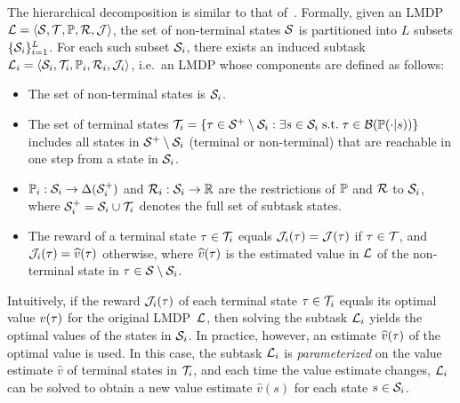 The hierarchical decomposition is similar to that of~\citep{Wen2020}. Formally, given an LMDP $\mathcal{L}=\langle\mathcal{S},\mathcal{T},\mathbb{P},\mathcal{R},\mathcal{J}\rangle$, the set of non-terminal states $\mathcal{S}$ is partitioned into $L$ subsets $\{\mathcal{S}_i\}_{i=1}^L$. For each such subset $\mathcal{S}_i$, there exists an induced subtask $\linebreak {\cL_i=\langle\cS_i,\cT_i,\kernel_i,\cR_i,\cJ_i\rangle}$, i.e.~an LMDP whose components are defined as follows:
\begin{itemize}
\item The set of non-terminal states is $\mathcal{S}_i$.
\item The set of terminal states $\mathcal{T}_i=\{\tau \in\mathcal{S}^+\setminus\mathcal{S}_i:\exists s\in \mathcal{S}_i \; \text{s.t.} \; \tau \in \mathcal{B}(\mathbb{P}(\cdot|s))\}$ includes all states in $\mathcal{S}^+\setminus\mathcal{S}_i$ (terminal or non-terminal) that are reachable in one step from a state in $\mathcal{S}_i$.
\item $\mathbb{P}_i:\mathcal{S}_i\rightarrow\Delta(\mathcal{S}_i^+)$ and $\mathcal{R}_i:\mathcal{S}_i\rightarrow\mathbb{R}$ are the restrictions of $\mathbb{P}$ and $\mathcal{R}$ to $\mathcal{S}_i$, where $\mathcal{S}_i^+=\mathcal{S}_i\cup\mathcal{T}_i$ denotes the full set of subtask states.
\item The reward of a terminal state $\tau \in\mathcal{T}_i$ equals $\mathcal{J}_i(\tau)=\mathcal{J}(\tau)$ if $\tau\in\mathcal{T}$, and $\mathcal{J}_i(\tau)=\widehat{v}(\tau)$ otherwise, where $\widehat{v}(\tau)$ is the estimated value in $\mathcal{L}$ of the non-terminal state in  $\tau\in\mathcal{S} \setminus \mathcal{S}_i$.
\end{itemize}

Intuitively, if the reward $\mathcal{J}_i(\tau)$ of each terminal state $\tau\in\mathcal{T}_i$ equals its optimal value $v(\tau)$ for the original LMDP~$\mathcal{L}$, then solving the subtask $\mathcal{L}_i$ yields the optimal values of the states in $\mathcal{S}_i$.
In practice, however, an estimate $\widehat{v}(\tau)$ of the optimal value is used.
In this case, the subtask $\mathcal{L}_i$ is {\em parameterized} on the value estimate $\widehat{v}$ of terminal states in $\mathcal{T}_i$, and each time the value estimate changes, $\mathcal{L}_i$ can be solved to obtain a new value estimate
$\widehat{v}(s)$ for each state $s\in\mathcal{S}_i$.



